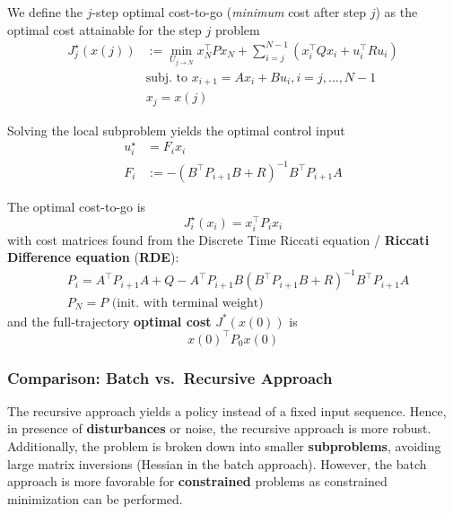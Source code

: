 We define the $j$-step optimal cost-to-go (\textit{minimum} cost after step $j$) as the optimal cost attainable for the step $j$ problem
\noindent\begin{align*}
    J_j^\star(x(j)) & :=\min_{U_{j\to N}}x_N^\top Px_N+\sum_{i=j}^{N-1}(x_i^\top Qx_i+u_i^\top Ru_i) \\
                    & \text{subj.\ to }x_{i+1}=Ax_i+Bu_i,i=j,\dots,N-1                               \\
                    & x_j=x(j)
\end{align*}

\newpar{}

Solving the local subproblem yields the optimal control input
\noindent\begin{align*}
    u_{i}^{\star} & =F_{i} x_{i}                                   \\
    F_{i}         & :=-{(B^\top P_{i+1} B+R)}^{-1}B^\top P_{i+1} A
\end{align*}

The optimal cost-to-go is
\noindent\begin{equation*}
    J_{i}^{\star}(x_{i})  = x_{i}^{\top}P_{i}x_{i}
\end{equation*}
with cost matrices found from the Discrete Time Riccati equation / \textbf{Riccati Difference equation} (\textbf{RDE}):
\noindent\begin{align*}
     & P_{i} = A^\top P_{i+1} A+Q-A^\top P_{i+1} B{(B^\top P_{i+1} B+R)}^{-1}B^\top P_{i+1} A \\
     & P_{N} = P \text{ (init.\ with terminal weight)}
\end{align*}
and the full-trajectory \textbf{optimal cost} $J^*(x(0))$ is
\noindent\begin{equation*}
    {x(0)}^\top P_0 x(0)
\end{equation*}

\subsubsection{Comparison: Batch vs.\ Recursive Approach}

The recursive approach yields a policy instead of a fixed input sequence. Hence, in presence of \textbf{disturbances} or noise, the recursive approach is more robust. Additionally, the problem is broken down into smaller \textbf{subproblems}, avoiding large matrix inversions (Hessian in the batch approach). However, the batch approach is more favorable for \textbf{constrained} problems as constrained minimization can be performed.

